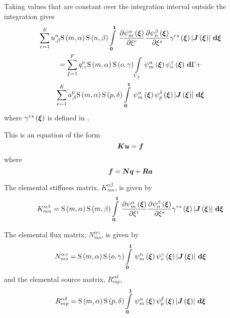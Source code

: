 Taking values that are constant over the integration interval outside the
integration gives
\begin{multline}
  \dsum_{e=1}^{E}\nodedof{u}{n}{\beta}\gsf{m}{\alpha}\gsf{n}{\beta}
  \gint{\vectr{0}}{\vectr{1}}{\delby{\gbfn{m}{\alpha}{\vectr{\xi}}}{\xi^{r}}
  \delby{\gbfn{n}{\beta}{\vectr{\xi}}}{\xi^{s}}\fnof{\gamma^{rs}}{\vectr{\xi}}
  \abs{\fnof{\matr{J}}{\vectr{\xi}}}}{\vectr{\xi}} \\ 
  =\dsum_{f=1}^{F}\nodedof{q}{o}{\gamma}\gsf{m}{\alpha}\gsf{o}{\gamma}
  \gint{\Gamma_{f}}{}{\gbfn{m}{\alpha}{\vectr{\xi}}\gbfn{o}{\gamma}{\vectr{\xi}}
  }{\Gamma} + \\
  \dsum_{e=1}^{E}\nodedof{a}{p}{\delta}\gsf{m}{\alpha}\gsf{p}{\delta}
  \gint{\vectr{0}}{\vectr{1}}{\gbfn{m}{\alpha}{\vectr{\xi}}
    \gbfn{p}{\delta}{\vectr{\xi}}\abs{\fnof{\matr{J}}{\vectr{\xi}}}}{\vectr{\xi}}
\end{multline}
where $ \gamma^{rs}\left( \boldsymbol{\xi} \right) $ is defined in 
.

This is an equation of the form
\begin{equation}
  \matr{K}\vect{u}=\vect{f}
\end{equation}
where
\begin{equation}
  \vect{f}=\matr{N}\vect{q}+\matr{R}\vect{a}
\end{equation}

The elemental stiffness matrix, $K^{\alpha\beta}_{mn}$, is given by
\begin{equation}
  K^{\alpha\beta}_{mn}=\gsf{m}{\alpha}\gsf{m}{\beta}
  \gint{\vectr{0}}{\vectr{1}}{\delby{\gbfn{m}{\alpha}{\vectr{\xi}}}{\xi^{r}}
    \delby{\gbfn{n}{\beta}{\vectr{\xi}}}{\xi^{s}}\fnof{\gamma^{rs}}{\vectr{\xi}}
    \abs{\fnof{\matr{J}}{\vectr{\xi}}}}{\vectr{\xi}}
  \label{eqn:elementalfemlhs2}
\end{equation}

The elemental flux matrix, $N^{\alpha\gamma}_{mo}$, is given by
\begin{equation}
  N^{\alpha\gamma}_{mo} =\gsf{m}{\alpha}\gsf{o}{\gamma}
  \gint{\vectr{0}}{\vectr{1}}{\gbfn{m}{\alpha}{\vectr{\xi}}\gbfn{o}{\gamma}{\vectr{\xi}}
    \abs{\fnof{\matr{J}}{\vectr{\xi}}}}{\vectr{\xi}}
\end{equation}
and the elemental source matrix, $R^{\alpha\delta}_{mp}$, 
\begin{equation}
  R^{\alpha\delta}_{mp}=\gsf{m}{\alpha}\gsf{p}{\delta}
  \gint{\vectr{0}}{\vectr{1}}{\gbfn{m}{\alpha}{\vectr{\xi}}\gbfn{p}{\delta}{\vectr{\xi}}
    \abs{\fnof{\matr{J}}{\vectr{\xi}}}}{\vectr{\xi}}
\end{equation}

